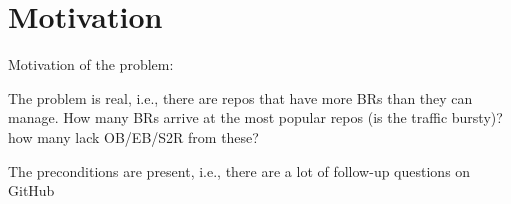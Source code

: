 \section{Motivation}



Motivation of the problem:

The problem is real, i.e., there are repos that have more BRs than they can manage. How many BRs arrive at the most popular repos (is the traffic bursty)? how many lack OB/EB/S2R from these?

The preconditions are present, i.e., there are a lot of follow-up questions on GitHub
